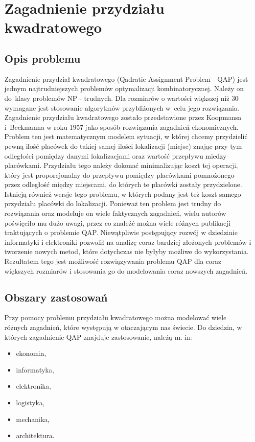 \chapter{Zagadnienie przydziału kwadratowego}
\label{cha:qap}

\section{Opis problemu}
\label{sec:opis}
Zagadnienie przydział kwadratowego (Qadratic Assignment Problem - QAP) jest jednym najtrudniejszych problemów optymalizacji kombinatorycznej. Należy on do~klasy problemów NP - trudnych. Dla rozmiarów o wartości większej niż 30 wymagane jest stosowanie algorytmów przybliżonych w~celu jego rozwiązania. Zagadnienie przydziału kwadratowego zostało przedstawione przez Koopmansa i~Beckmanna w roku 1957 jako sposób rozwiązania zagadnień ekonomicznych. Problem ten jest matematycznym modelem sytuacji, w której chcemy przydzielić pewną ilość placówek do takiej samej ilości lokalizacji (miejsc) znając przy tym odległości pomiędzy danymi lokalizacjami oraz wartość przepływu miedzy placówkami. Przydziału tego należy dokonać minimalizując koszt tej operacji, który jest proporcjonalny do przepływu pomiędzy placówkami pomnożonego przez odległość między miejscami, do których te placówki zostały przydzielone. Istnieją również wersje tego problemu, w których podany jest też koszt samego przydziału placówki do lokalizacji. Ponieważ ten problem jest trudny do rozwiązania oraz modeluje on wiele faktycznych zagadnień, wielu autorów poświęciło mu dużo uwagi, przez co znaleźć można wiele różnych publikacji traktujących o problemie QAP. Niewątpliwie postępujący rozwój w dziedzinie informatyki i elektroniki pozwolił na analizę coraz bardziej złożonych problemów i tworzenie nowych metod, które dotychczas nie byłyby możliwe do wykorzystania. Rezultatem tego jest możliwość rozwiązywania problemu QAP dla coraz większych rozmiarów i stosowania go do modelowania coraz nowszych zagadnień.

\section{Obszary zastosowań}
\label{sec:zastosowanie}
Przy pomocy problemu przydziału kwadratowego można modelować wiele różnych zagadnień, które występują w otaczającym nas świecie. Do dziedzin, w których zagadnienie QAP znajduje zastosowanie, należą m. in:
\begin{itemize}
\item ekonomia,
\item informatyka,
\item elektronika,
\item logistyka,
\item mechanika,
\item architektura.
\end{itemize}

